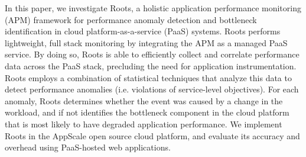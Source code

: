 In this paper, we investigate Roots, a holistic 
application performance monitoring (APM) framework for 
performance anomaly detection and bottleneck identification 
in cloud platform-as-a-service (PaaS) systems.
Roots performs lightweight, full stack monitoring by integrating
the APM as a managed PaaS service.  By doing so, Roots is able to 
efficiently collect and correlate performance data across the PaaS stack,
precluding the need for application instrumentation.  Roots employs
a combination of statistical techniques that analyze this data to detect performance
anomalies (i.e. violations of service-level objectives). For each anomaly, 
Roots determines whether the event was caused by a change in 
the workload, and if not identifies the bottleneck component in the cloud platform
that is most likely to have degraded application performance. 
We implement Roots in the AppScale open source cloud platform, and evaluate its 
accuracy and overhead using PaaS-hosted web applications.

